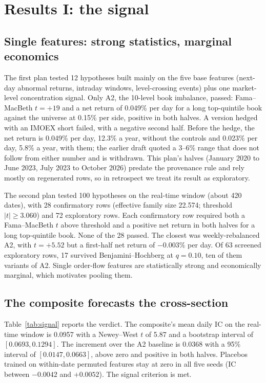 \section{Results I: the signal}\label{sec:signal}

\subsection{Single features: strong statistics, marginal economics}

The first plan tested 12 hypotheses built mainly on the five base features (next-day abnormal returns, intraday windows, level-crossing events) plus one market-level concentration signal. Only A2, the 10-level book imbalance, passed: Fama--MacBeth $t=+19$ and a net return of 0.049\% per day for a long top-quintile book against the universe at 0.15\% per side, positive in both halves. A version hedged with an IMOEX short failed, with a negative second half. Before the hedge, the net return is 0.049\% per day, 12.3\% a year, without the controls and 0.023\% per day, 5.8\% a year, with them; the earlier draft quoted a 3--6\% range that does not follow from either number and is withdrawn. This plan's halves (January 2020 to June 2023, July 2023 to October 2026) predate the provenance rule and rely mostly on regenerated rows, so in retrospect we treat its result as exploratory.

The second plan tested 100 hypotheses on the real-time window (about 420 dates), with 28 confirmatory rows (effective family size 22.574; threshold $|t|\ge3.060$) and 72 exploratory rows. Each confirmatory row required both a Fama--MacBeth $t$ above threshold and a positive net return in both halves for a long top-quintile book. None of the 28 passed. The closest was weekly-rebalanced A2, with $t=+5.52$ but a first-half net return of $-0.003\%$ per day. Of 63 screened exploratory rows, 17 survived Benjamini--Hochberg at $q=0.10$, ten of them variants of A2. Single order-flow features are statistically strong and economically marginal, which motivates pooling them.

\subsection{The composite forecasts the cross-section}\label{sec:momentum}

Table~\ref{tab:signal} reports the verdict. The composite's mean daily IC on the real-time window is 0.0957 with a Newey--West $t$ of 5.87 and a bootstrap interval of $[0.0693,0.1294]$. The increment over the A2 baseline is 0.0368 with a 95\% interval of $[0.0147,0.0663]$, above zero and positive in both halves. Placebos trained on within-date permuted features stay at zero in all five seeds (IC between $-0.0042$ and $+0.0052$). The signal criterion is met.

